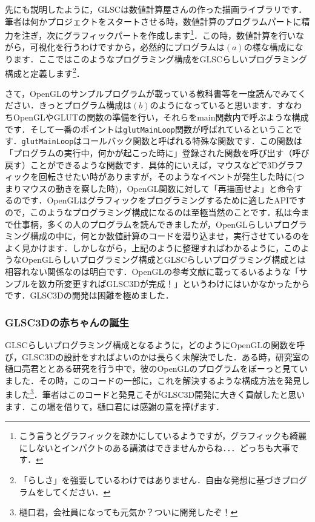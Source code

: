\documentclass[a4paper,12pt]{jsarticle}%
\begin{document}
先にも説明したように，GLSCは数値計算屋さんの作った描画ライブラリです．筆者は何かプロジェクトをスタートさせる時，数値計算のプログラムパートに精力を注ぎ，次にグラフィックパートを作成します\footnote{こう言うとグラフィックを疎かにしているようですが，グラフィックも綺麗にしないとインパクトのある講演はできませんからね．．．どっちも大事です．}．この時，数値計算を行いながら，可視化を行うわけですから，必然的にプログラムは$(a)$の様な構成になります．ここではこのようなプログラミング構成をGLSCらしいプログラミング構成と定義します\footnote{「らしさ」を強要しているわけではありません．自由な発想に基づきプログラムをしてください．}．

さて，OpenGLのサンプルプログラムが載っている教科書等を一度読んでみてください．きっとプログラム構成は$(b)$のようになっていると思います．すなわちOpenGLやGLUTの関数の準備を行い，それらをmain関数内で呼ぶような構成です．そして一番のポイントは\verb|glutMainLoop|関数が呼ばれているということです．\verb|glutMainLoop|はコールバック関数と呼ばれる特殊な関数です．この関数は「プログラムの実行中，何かが起こった時に」登録された関数を呼び出す（呼び戻す）ことができるような関数です．具体的にいえば，マウスなどで3Dグラフィックを回転させたい時がありますが，そのようなイベントが発生した時に(つまりマウスの動きを察した時)，OpenGL関数に対して「再描画せよ」と命令するのです．OpenGLはグラフィックをプログラミングするために適したAPIですので，このようなプログラミング構成になるのは至極当然のことです．私は今まで仕事柄，多くの人のプログラムを読んできましたが，OpenGLらしいプログラミング構成の中に，何とか数値計算のコードを潜り込ませ，実行させているのをよく見かけます．しかしながら，上記のように整理すればわかるように，このようなOpenGLらしいプログラミング構成とGLSCらしいプログラミング構成とは相容れない関係なのは明白です．OpenGLの参考文献に載ってるいるような「サンプルを数カ所変更すればGLSC3Dが完成！」というわけにはいかなかったからです．GLSC3Dの開発は困難を極めました．

\subsubsection{GLSC3Dの赤ちゃんの誕生}

GLSCらしいプログラミング構成となるように，どのようにOpenGLの関数を呼び，GLSC3Dの設計をすればよいのかは長らく未解決でした．ある時，研究室の樋口亮君ととある研究を行う中で，彼のOpenGLのプログラムをぼーっと見ていました．その時，このコードの一部に，これを解決するような構成方法を発見しました\footnote{樋口君，会社員になっても元気か？ついに開発したぞ！}．筆者はこのコードと発見こそがGLSC3D開発に大きく貢献したと思います．この場を借りて，樋口君には感謝の意を捧げます．
\end{document}
